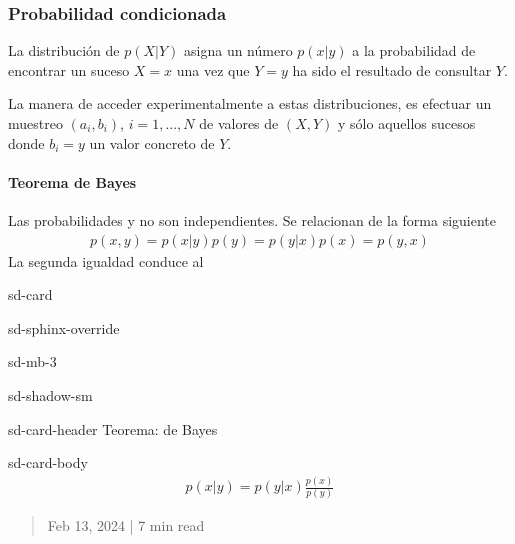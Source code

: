 \documentclass[letterpaper,10pt,english]{jupyterBook}
\begin{document}
\subsubsection{Probabilidad condicionada}
\label{\detokenize{docs/Part_01_Formalismo/Chapter_01_02_Formalismo_matem_xe1tico/01_05_Probabilidades_myst:probabilidad-condicionada}}
\sphinxAtStartPar
La distribución de  \(p(X|Y)\) asigna un número \(p(x|y)\) a la probabilidad  de encontrar un suceso \(X=x\) una vez  que \(Y=y\) ha sido el resultado de consultar \(Y\).

\sphinxAtStartPar
La manera de acceder experimentalmente a estas distribuciones, es efectuar un muestreo \((a_i,b_i)\), \(i=1,...,N\) de valores de \((X,Y)\) y  sólo aquellos sucesos donde \(b_i = y\) un valor concreto de \(Y\).


\paragraph{Teorema de Bayes}
\label{\detokenize{docs/Part_01_Formalismo/Chapter_01_02_Formalismo_matem_xe1tico/01_05_Probabilidades_myst:teorema-de-bayes}}
\sphinxAtStartPar
Las probabilidades  y  no son independientes. Se relacionan de la forma siguiente
\begin{equation*}
\begin{split}
p(x,y)   = p(x|y)p(y) = p(y|x) p(x)= p(y,x)
\end{split}
\end{equation*}
\sphinxAtStartPar
La segunda igualdad conduce al 

\begin{sphinxuseclass}{sd-card}
\begin{sphinxuseclass}{sd-sphinx-override}
\begin{sphinxuseclass}{sd-mb-3}
\begin{sphinxuseclass}{sd-shadow-sm}
\begin{sphinxuseclass}{sd-card-header}
\sphinxAtStartPar
Teorema: de Bayes

\end{sphinxuseclass}
\begin{sphinxuseclass}{sd-card-body}\begin{equation*}
\begin{split}
p(x|y) = p(y|x) \frac{p(x)}{p(y)}
\end{split}
\end{equation*}
\end{sphinxuseclass}
\end{sphinxuseclass}
\end{sphinxuseclass}
\end{sphinxuseclass}
\end{sphinxuseclass}
\sphinxstepscope
\begin{quote}

\sphinxAtStartPar
Feb 13, 2024 | 7 min read
\end{quote}
\end{document}
